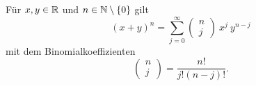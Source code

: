 \begin{lemma}{}{}



Für \(x,y \in \mathbb{R}\) und \(n \in \mathbb{N}\setminus\{0\}\) gilt
\begin{equation*}
 (x+y)^n = \sum_{j=0}^\infty (\begin{matrix} n\\j \end{matrix} ) ~  x^j~ y^{n-j}
\end{equation*}
mit dem Binomialkoeffizienten
\begin{equation*}
  (\begin{matrix} n\\j \end{matrix} ) = \frac{n!}{j! (n-j)!}.
\end{equation*}\end{lemma}

